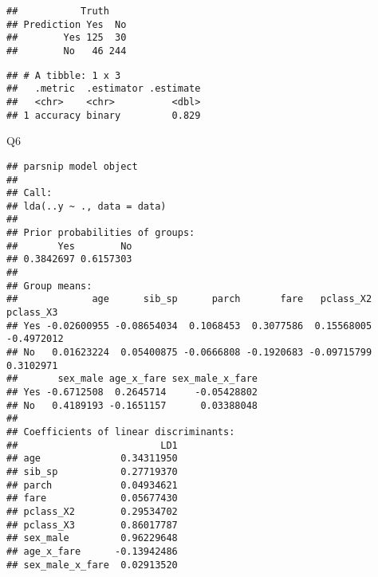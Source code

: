 \documentclass[]{article}
\newenvironment{Shaded}{\begin{snugshade}}{\end{snugshade}}
\newcommand{\DataTypeTok}[1]{\textcolor[rgb]{0.13,0.29,0.53}{#1}}
\newcommand{\KeywordTok}[1]{\textcolor[rgb]{0.13,0.29,0.53}{\textbf{#1}}}
\newcommand{\NormalTok}[1]{#1}
\newcommand{\OperatorTok}[1]{\textcolor[rgb]{0.81,0.36,0.00}{\textbf{#1}}}
\newcommand{\StringTok}[1]{\textcolor[rgb]{0.31,0.60,0.02}{#1}}
\begin{document}
\begin{verbatim}
##           Truth
## Prediction Yes  No
##        Yes 125  30
##        No   46 244
\end{verbatim}

\begin{Shaded}
\end{Shaded}

\begin{verbatim}
## # A tibble: 1 x 3
##   .metric  .estimator .estimate
##   <chr>    <chr>          <dbl>
## 1 accuracy binary         0.829
\end{verbatim}

Q6

\begin{Shaded}
\end{Shaded}

\begin{verbatim}
## parsnip model object
## 
## Call:
## lda(..y ~ ., data = data)
## 
## Prior probabilities of groups:
##       Yes        No 
## 0.3842697 0.6157303 
## 
## Group means:
##             age      sib_sp      parch       fare   pclass_X2  pclass_X3
## Yes -0.02600955 -0.08654034  0.1068453  0.3077586  0.15568005 -0.4972012
## No   0.01623224  0.05400875 -0.0666808 -0.1920683 -0.09715799  0.3102971
##       sex_male age_x_fare sex_male_x_fare
## Yes -0.6712508  0.2645714     -0.05428802
## No   0.4189193 -0.1651157      0.03388048
## 
## Coefficients of linear discriminants:
##                         LD1
## age              0.34311950
## sib_sp           0.27719370
## parch            0.04934621
## fare             0.05677430
## pclass_X2        0.29534702
## pclass_X3        0.86017787
## sex_male         0.96229648
## age_x_fare      -0.13942486
## sex_male_x_fare  0.02913520
\end{verbatim}
\end{document}
